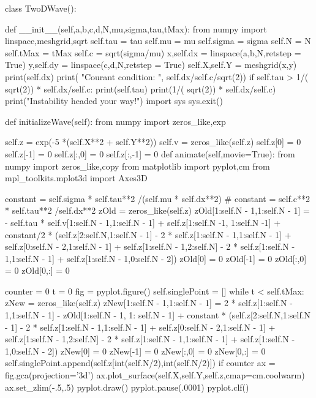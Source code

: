 \begin{codeexample}
\begin{VerbatimOut}{\listingFile}




class TwoDWave():

    def __init__(self,a,b,c,d,N,mu,sigma,tau,tMax):
        from numpy import linspace,meshgrid,sqrt
        self.tau = tau
        self.mu = mu
        self.sigma = sigma
        self.N = N
        self.tMax = tMax
        self.c = sqrt(sigma/mu)
        x,self.dx = linspace(a,b,N,retstep = True)
        y,self.dy = linspace(c,d,N,retstep = True)
        self.X,self.Y = meshgrid(x,y)
        print(self.dx)
        print( "Courant condition: ", self.dx/self.c/sqrt(2))
        if self.tau > 1/( sqrt(2)) *  self.dx/self.c:
            print(self.tau)
            print(1/( sqrt(2)) *  self.dx/self.c)
            print("Instability headed your way!")
            import sys
            sys.exit()

    def initializeWave(self):
        from numpy import zeros_like,exp
        
        self.z = exp(-5 *(self.X**2 + self.Y**2))
        self.v = zeros_like(self.z)
        self.z[0] = 0
        self.z[-1] = 0
        self.z[:,0] = 0
        self.z[:,-1] = 0
    def animate(self,movie=True):
        from numpy import zeros_like,copy
        from matplotlib import pyplot,cm
        from mpl_toolkits.mplot3d import Axes3D
        
        constant = self.sigma * self.tau**2 /(self.mu * self.dx**2)
        #        constant = self.c**2 * self.tau**2 /self.dx**2
        zOld = zeros_like(self.z)
        zOld[1:self.N - 1,1:self.N - 1] = - self.tau * self.v[1:self.N - 1,1:self.N - 1] + self.z[1:self.N -1, 1:self.N -1] + constant/2 * (self.z[2:self.N,1:self.N - 1] - 2 * self.z[1:self.N - 1,1:self.N - 1] + self.z[0:self.N - 2,1:self.N - 1] + self.z[1:self.N - 1,2:self.N] - 2 * self.z[1:self.N - 1,1:self.N - 1] + self.z[1:self.N - 1,0:self.N - 2])
        zOld[0] = 0
        zOld[-1] = 0
        zOld[:,0] = 0
        zOld[0,:] = 0

        counter = 0
        t = 0
        fig = pyplot.figure()
        self.singlePoint = []
        while t < self.tMax:
            zNew = zeros_like(self.z)
            zNew[1:self.N - 1,1:self.N - 1] = 2 * self.z[1:self.N - 1,1:self.N - 1] - zOld[1:self.N - 1, 1: self.N - 1] + constant * (self.z[2:self.N,1:self.N - 1] - 2 * self.z[1:self.N - 1,1:self.N - 1] + self.z[0:self.N - 2,1:self.N - 1] + self.z[1:self.N - 1,2:self.N] - 2 * self.z[1:self.N - 1,1:self.N - 1] + self.z[1:self.N - 1,0:self.N - 2])
            zNew[0] = 0
            zNew[-1] = 0
            zNew[:,0] = 0
            zNew[0,:] = 0
            self.singlePoint.append(self.z[int(self.N/2),int(self.N/2)])
            if counter %
                ax = fig.gca(projection='3d')
                ax.plot_surface(self.X,self.Y,self.z,cmap=cm.coolwarm)
                ax.set_zlim(-.5,.5)
                pyplot.draw()
                pyplot.pause(.0001)
                pyplot.clf()
                

\end{VerbatimOut}
\end{codeexample}
